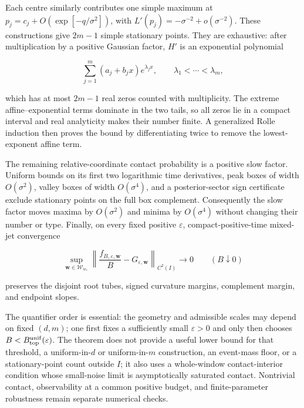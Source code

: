 Each centre similarly contributes one simple maximum at
$p_j=c_j+O(\exp[-q/\sigma^2])$, with
$L'(p_j)=-\sigma^{-2}+o(\sigma^{-2})$.  These constructions give
$2m-1$ simple stationary points.  They are exhaustive: after multiplication
by a positive Gaussian factor, $H'$ is an exponential polynomial

\begin{equation}
 \sum_{j=1}^{m}(a_j+b_jx)e^{\lambda_jx},
 \qquad \lambda_1<\cdots<\lambda_m,
 \label{eq:exact-m-exp-polynomial}
\end{equation}

which has at most $2m-1$ real zeros counted with multiplicity.  The extreme
affine--exponential terms dominate in the two tails, so all zeros lie in a
compact interval and real analyticity makes their number finite.  A
generalized Rolle induction then proves the bound by differentiating twice to
remove the lowest-exponent affine term.

The remaining relative-coordinate contact probability is a positive slow
factor.  Uniform bounds on its first two logarithmic time derivatives, peak
boxes of width $O(\sigma^2)$, valley boxes of width $O(\sigma^4)$, and a
posterior-sector sign certificate exclude stationary points on the full box
complement.  Consequently the slow factor moves maxima by $O(\sigma^2)$ and
minima by $O(\sigma^4)$ without changing their number or type.  Finally, on
every fixed positive $\varepsilon$, compact-positive-time mixed-jet
convergence

\begin{equation}
 \sup_{\bm w\in\mathcal W_{w_*}}
 \left\|\frac{f_{B,\varepsilon,\bm w}}{B}
       -G_{\varepsilon,\bm w}\right\|_{C^2(I)}
 \longrightarrow0
 \qquad (B\downarrow0)
 \label{eq:exact-m-weak-budget}
\end{equation}

preserves the disjoint root tubes, signed curvature margins, complement
margin, and endpoint slopes.

The quantifier order is essential: the geometry and admissible scales may
depend on fixed $(d,m)$; one first fixes a sufficiently small
$\varepsilon>0$ and only then chooses
$B<B_{\rm top}^{\rm unif}(\varepsilon)$.  The theorem does not provide a
useful lower bound for that threshold, a uniform-in-$d$ or uniform-in-$m$
construction, an event-mass floor, or a stationary-point count outside $I$;
it also uses a whole-window contact-interior condition whose small-noise limit
is asymptotically saturated contact.  Nontrivial contact, observability at a
common positive budget, and finite-parameter robustness remain separate
numerical checks.
